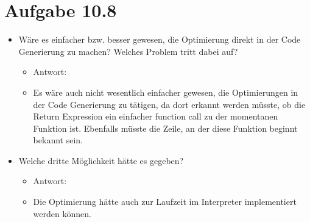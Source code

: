 \documentclass[a4paper, 10pt]{article}
\begin{document}
\section{Aufgabe 10.8}
\begin{itemize}
	\item Wäre es einfacher bzw. besser gewesen, die Optimierung
	      direkt in der Code Generierung zu machen?
	      Welches Problem tritt dabei auf?
	      \begin{itemize}
		      \item[] Antwort:
		      \item[] Es wäre auch nicht wesentlich einfacher gewesen,
		            die Optimierungen in der Code Generierung zu tätigen, da dort
		            erkannt werden müsste, ob die Return Expression ein einfacher function call zu der momentanen Funktion ist.
		            Ebenfalls müsste die Zeile, an der diese Funktion beginnt bekannt sein.
	      \end{itemize}
	\item Welche dritte Möglichkeit hätte es gegeben?
	      \begin{itemize}
		      \item[] Antwort:
		      \item[] Die Optimierung hätte auch zur Laufzeit im Interpreter implementiert werden können.
	      \end{itemize}
\end{itemize}
\end{document}

